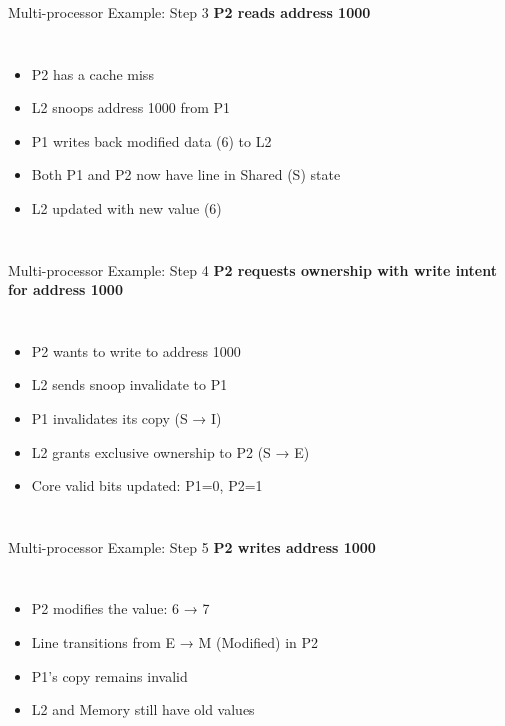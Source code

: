 \documentclass[aspectratio=169,12pt]{beamer}
\begin{document}
\begin{frame}{Multi-processor Example: Step 3}
  \textbf{P2 reads address 1000}
  
  \begin{columns}
    \begin{itemize}
      \item P2 has a cache miss
      \item L2 snoops address 1000 from P1
      \item P1 writes back modified data (6) to L2
      \item Both P1 and P2 now have line in Shared (S) state
      \item L2 updated with new value (6)
    \end{itemize}
    
  \end{columns}
\end{frame}

\begin{frame}{Multi-processor Example: Step 4}
  \textbf{P2 requests ownership with write intent for address 1000}
  
  \begin{columns}
    \begin{itemize}
      \item P2 wants to write to address 1000
      \item L2 sends snoop invalidate to P1
      \item P1 invalidates its copy (S → I)
      \item L2 grants exclusive ownership to P2 (S → E)
      \item Core valid bits updated: P1=0, P2=1
    \end{itemize}
    
  \end{columns}
\end{frame}

\begin{frame}{Multi-processor Example: Step 5}
  \textbf{P2 writes address 1000}
  \begin{columns}
    \begin{itemize}
      \item P2 modifies the value: 6 → 7
      \item Line transitions from E → M (Modified) in P2
      \item P1's copy remains invalid
      \item L2 and Memory still have old values
    \end{itemize}
    
  \end{columns}
\end{frame}
\end{document}

